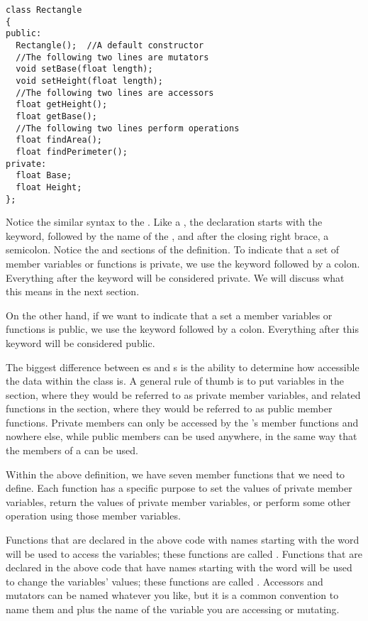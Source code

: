 \noindent\begin{minipage}{\linewidth}\begin{lstlisting}
class Rectangle
{
public: 
  Rectangle();	//A default constructor
  //The following two lines are mutators
  void setBase(float length); 
  void setHeight(float length);
  //The following two lines are accessors
  float getHeight();	
  float getBase();
  //The following two lines perform operations	
  float findArea();	
  float findPerimeter();
private:
  float Base;
  float Height;
};
\end{lstlisting}\end{minipage}

Notice the similar syntax to the . 
Like a , the declaration starts with the  keyword, followed by the name of the , and after the closing right brace, a semicolon. 
Notice the  and  sections of the definition. 
To indicate that a set of member variables or functions is private, we use the  keyword followed by a colon. 
Everything after the keyword will be considered private.
We will discuss what this means in the next section.

On the other hand, if we want to indicate that a set a member variables or functions is public, we use the keyword  followed by a colon. 
Everything after this keyword will be considered public. 


The biggest difference between es and s is the ability to determine how accessible the data within the class is. 
A general rule of thumb is to put variables in the  section, where they would be referred to as private member variables, and related functions in the  section, where they would be referred to as public member functions. 
Private members can only be accessed by the 's member functions and nowhere else, while public members can be used anywhere, in the same way that the members of a  can be used.

Within the above  definition, we have seven member functions that we need to define. 
Each function has a specific purpose to set the values of private member variables, return the values of private member variables, or perform some other operation using those member variables.

Functions that are declared in the above code with names starting with the word  will be used to access the variables; these functions are called . 
Functions that are declared in the above code that have names starting with the word  will be used to change the variables' values; these functions are called . 
Accessors and mutators can be named whatever you like, but it is a common convention to name them  and  plus the name of the variable you are accessing or mutating. 

